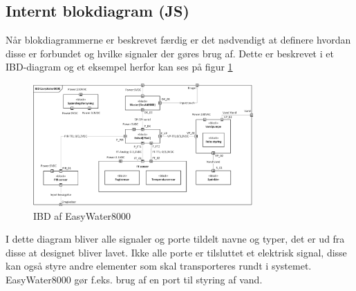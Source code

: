 \subsection{Internt blokdiagram (JS)}
Når blokdiagrammerne er beskrevet færdig er det nødvendigt at definere hvordan disse er forbundet og hvilke signaler der gøres brug af. Dette er beskrevet i et IBD-diagram og et eksempel herfor kan ses på figur \ref{lab:IBD}

\begin{figure}[H]
  \centering
    \includegraphics[width=0.75\textwidth]{Billeder/IBD}
    \caption{IBD af EasyWater8000}
    \label{lab:IBD}
\end{figure}

I dette diagram bliver alle signaler og porte tildelt navne og typer, det er ud fra disse at designet bliver lavet. Ikke alle porte er tilsluttet et elektrisk signal, disse kan også styre andre elementer som skal transporteres rundt i systemet. EasyWater8000 gør f.eks. brug af en port til styring af vand.